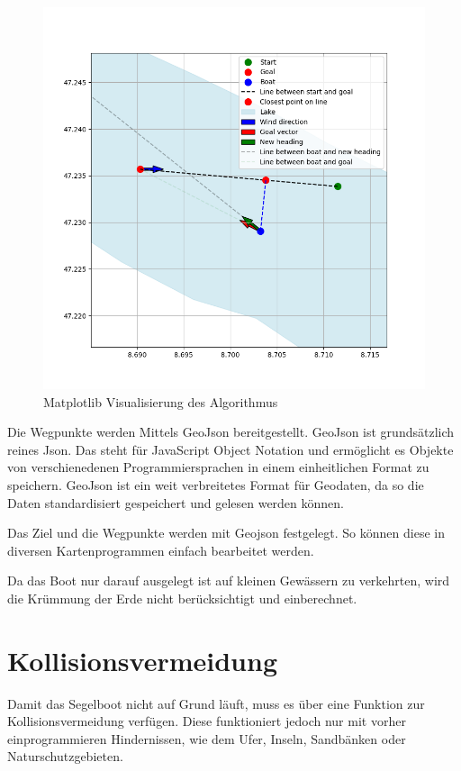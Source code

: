 \begin{figure}[H]
    \centering
    \includegraphics[width=1\linewidth]{assets/3.png}
    \caption{Matplotlib Visualisierung des Algorithmus}
    
\end{figure}

Die Wegpunkte werden Mittels GeoJson bereitgestellt. GeoJson ist grundsätzlich reines Json. Das steht für JavaScript Object Notation und ermöglicht es Objekte von verschienedenen Programmiersprachen in einem einheitlichen Format zu speichern. GeoJson ist ein weit verbreitetes Format für Geodaten, da so die Daten standardisiert gespeichert und gelesen werden können.

Das Ziel und die Wegpunkte werden mit Geojson festgelegt. So können diese in diversen Kartenprogrammen einfach bearbeitet werden.

Da das Boot nur darauf ausgelegt ist auf kleinen Gewässern zu verkehrten, wird die Krümmung der Erde nicht berücksichtigt und einberechnet.

\section{Kollisionsvermeidung}
Damit das Segelboot nicht auf Grund läuft, muss es über eine Funktion zur Kollisionsvermeidung verfügen. Diese funktioniert jedoch nur mit vorher einprogrammieren Hindernissen, wie dem Ufer, Inseln, Sandbänken oder Naturschutzgebieten. 

